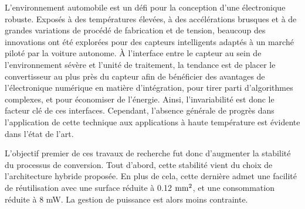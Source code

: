 \begin{mdframed}[linecolor=Prune,linewidth=1]
L'environnement automobile est un défi pour la conception d'une électronique robuste. Exposés à des températures élevées, à des accélérations brusques et à de grandes variations de procédé de fabrication et de tension, beaucoup des innovations ont été explorées pour des capteurs intelligents adaptés à un marché piloté par la voiture autonome. À l'interface entre le capteur au sein de l'environnement sévère et l'unité de traitement, la tendance est de placer le convertisseur au plus près du capteur afin de bénéficier des avantages de l'électronique numérique en matière d'intégration, pour tirer parti d'algorithmes complexes, et pour économiser de l'énergie. Ainsi, l'invariabilité est donc le facteur clé de ces interfaces. Cependant, l’absence générale de progrès dans l’application de cette technique aux applications à haute température est évidente dans l'état de l'art.

L'objectif premier de ces travaux de recherche fut donc d'augmenter la stabilité du processus de conversion. Tout d'abord, cette stabilité vient du choix de l'architecture hybride proposée. En plus de cela, cette dernière admet une facilité de réutilisation avec une surface réduite à 0.12 $\rm mm^2$, et une consommation réduite à 8 mW. La gestion de puissance est alors moins contrainte.
\end{mdframed}

